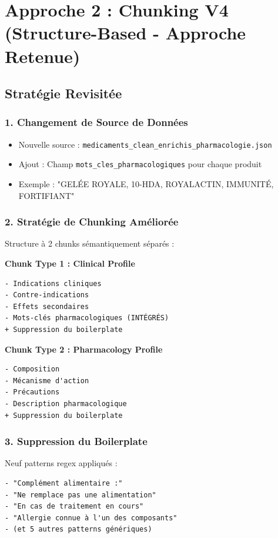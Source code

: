 \documentclass[12pt,a4paper]{article}
\begin{document}
\section{Approche 2 : Chunking V4 (Structure-Based - Approche Retenue)}

\subsection{Stratégie Revisitée}

\subsubsection{1. Changement de Source de Données}
\begin{itemize}
    \item Nouvelle source : \texttt{medicaments\_clean\_enrichis\_pharmacologie.json}
    \item Ajout : Champ \texttt{mots\_cles\_pharmacologiques} pour chaque produit
    \item Exemple : "GELÉE ROYALE, 10-HDA, ROYALACTIN, IMMUNITÉ, FORTIFIANT"
\end{itemize}

\subsubsection{2. Stratégie de Chunking Améliorée}
Structure à 2 chunks sémantiquement séparés :

\textbf{Chunk Type 1 : Clinical Profile}
\begin{verbatim}
- Indications cliniques
- Contre-indications
- Effets secondaires
- Mots-clés pharmacologiques (INTÉGRÉS)
+ Suppression du boilerplate
\end{verbatim}

\textbf{Chunk Type 2 : Pharmacology Profile}
\begin{verbatim}
- Composition
- Mécanisme d'action
- Précautions
- Description pharmacologique
+ Suppression du boilerplate
\end{verbatim}

\subsubsection{3. Suppression du Boilerplate}
Neuf patterns regex appliqués :
\begin{verbatim}
- "Complément alimentaire :"
- "Ne remplace pas une alimentation"
- "En cas de traitement en cours"
- "Allergie connue à l'un des composants"
- (et 5 autres patterns génériques)
\end{verbatim}
\end{document}

